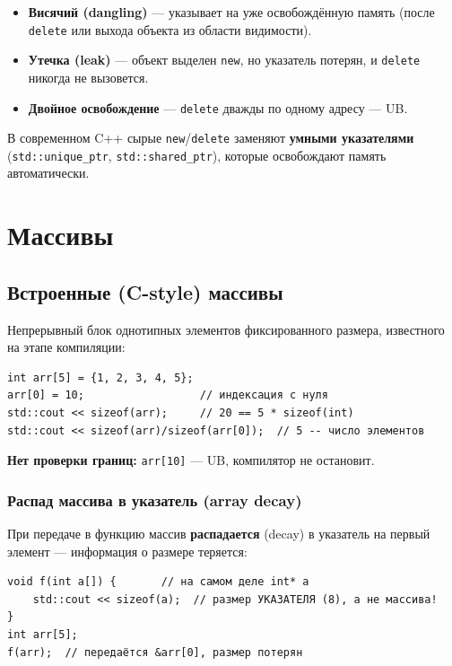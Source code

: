 \begin{itemize}[leftmargin=2em]
    \item \textbf{Висячий (dangling)} --- указывает на уже освобождённую память
          (после \texttt{delete} или выхода объекта из области видимости).
    \item \textbf{Утечка (leak)} --- объект выделен \texttt{new}, но указатель
          потерян, и \texttt{delete} никогда не вызовется.
    \item \textbf{Двойное освобождение} --- \texttt{delete} дважды по одному
          адресу --- UB.
\end{itemize}

В современном C++ сырые \texttt{new}/\texttt{delete} заменяют \textbf{умными
указателями} (\texttt{std::unique\_ptr}, \texttt{std::shared\_ptr}), которые
освобождают память автоматически.


\section{Массивы}

\subsection{Встроенные (C-style) массивы}

Непрерывный блок однотипных элементов фиксированного размера, известного на
этапе компиляции:

\begin{lstlisting}
int arr[5] = {1, 2, 3, 4, 5};
arr[0] = 10;                  // индексация с нуля
std::cout << sizeof(arr);     // 20 == 5 * sizeof(int)
std::cout << sizeof(arr)/sizeof(arr[0]);  // 5 -- число элементов
\end{lstlisting}

\textbf{Нет проверки границ:} \texttt{arr[10]} --- UB, компилятор не остановит.

\subsubsection{Распад массива в указатель (array decay)}

При передаче в функцию массив \textbf{распадается} (decay) в указатель на первый
элемент --- информация о размере теряется:

\begin{lstlisting}
void f(int a[]) {       // на самом деле int* a
    std::cout << sizeof(a);  // размер УКАЗАТЕЛЯ (8), а не массива!
}
int arr[5];
f(arr);  // передаётся &arr[0], размер потерян
\end{lstlisting}

